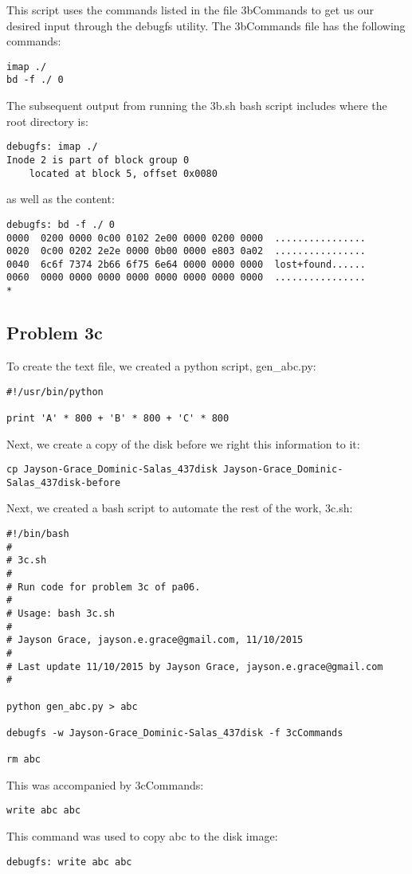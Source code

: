 \documentclass[12pt, a4paper, oneside]{article}
\begin{document}
This script uses the commands listed in the file 3bCommands to get us our desired input through the debugfs utility. The 3bCommands file has the following commands: 
\begin{lstlisting}
imap ./
bd -f ./ 0
\end{lstlisting}
The subsequent output from running the 3b.sh bash script includes where the root directory is:
\begin{lstlisting}
debugfs: imap ./
Inode 2 is part of block group 0
	located at block 5, offset 0x0080
\end{lstlisting}
as well as the content:
\begin{lstlisting}
debugfs: bd -f ./ 0
0000  0200 0000 0c00 0102 2e00 0000 0200 0000  ................
0020  0c00 0202 2e2e 0000 0b00 0000 e803 0a02  ................
0040  6c6f 7374 2b66 6f75 6e64 0000 0000 0000  lost+found......
0060  0000 0000 0000 0000 0000 0000 0000 0000  ................
*
\end{lstlisting}

\subsection*{Problem 3c}
To create the text file, we created a python script, gen\_abc.py:
\begin{lstlisting}
#!/usr/bin/python

print 'A' * 800 + 'B' * 800 + 'C' * 800
\end{lstlisting}

Next, we create a copy of the disk before we right this information to it:

\begin{lstlisting}
cp Jayson-Grace_Dominic-Salas_437disk Jayson-Grace_Dominic-Salas_437disk-before
\end{lstlisting}

Next, we created a bash script to automate the rest of the work, 3c.sh:
\begin{lstlisting}
#!/bin/bash
# 
# 3c.sh
#
# Run code for problem 3c of pa06.
#
# Usage: bash 3c.sh
#
# Jayson Grace, jayson.e.grace@gmail.com, 11/10/2015
#
# Last update 11/10/2015 by Jayson Grace, jayson.e.grace@gmail.com
# 

python gen_abc.py > abc

debugfs -w Jayson-Grace_Dominic-Salas_437disk -f 3cCommands

rm abc
\end{lstlisting}
This was accompanied by 3cCommands: 
\begin{lstlisting}
write abc abc
\end{lstlisting}
This command was used to copy abc to the disk image:
\begin{lstlisting}
debugfs: write abc abc
\end{lstlisting}
\end{document}
